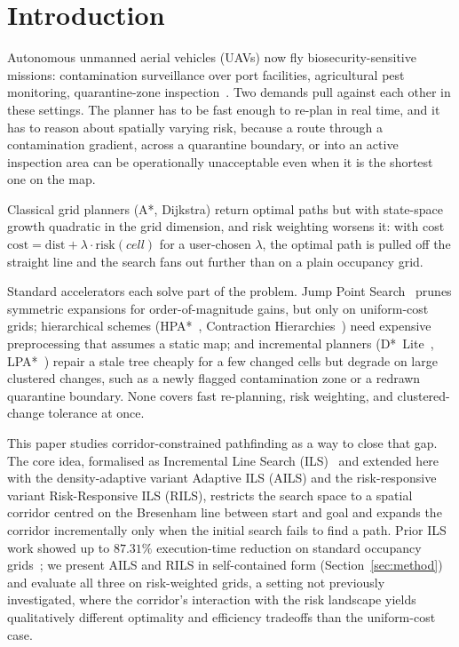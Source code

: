 \documentclass[preprint,12pt,authoryear]{elsarticle}
\begin{document}

\section{Introduction}\label{sec:intro}

Autonomous unmanned aerial vehicles (UAVs) now fly biosecurity-sensitive missions: contamination surveillance over port facilities, agricultural pest monitoring, quarantine-zone inspection~\citep{WHO2021,FAO2023}. Two demands pull against each other in these settings. The planner has to be fast enough to re-plan in real time, and it has to reason about spatially varying risk, because a route through a contamination gradient, across a quarantine boundary, or into an active inspection area can be operationally unacceptable even when it is the shortest one on the map.

Classical grid planners (A*, Dijkstra) return optimal paths but with state-space growth quadratic in the grid dimension, and risk weighting worsens it: with cost $\mathrm{cost} = \mathrm{dist} + \lambda \cdot \mathrm{risk}(cell)$ for a user-chosen $\lambda$, the optimal path is pulled off the straight line and the search fans out further than on a plain occupancy grid.

Standard accelerators each solve part of the problem. Jump Point Search~\citep{Harabor2011} prunes symmetric expansions for order-of-magnitude gains, but only on uniform-cost grids; hierarchical schemes (HPA*~\citep{Botea2004}, Contraction Hierarchies~\citep{Geisberger2008}) need expensive preprocessing that assumes a static map; and incremental planners (D*~Lite~\citep{Koenig2002}, LPA*~\citep{Koenig2004}) repair a stale tree cheaply for a few changed cells but degrade on large clustered changes, such as a newly flagged contamination zone or a redrawn quarantine boundary. None covers fast re-planning, risk weighting, and clustered-change tolerance at once.

This paper studies corridor-constrained pathfinding as a way to close that gap.
The core idea, formalised as Incremental Line Search (ILS)~\citep{Elshahed2025ILS} and extended here with the density-adaptive variant Adaptive ILS (AILS) and the risk-responsive variant Risk-Responsive ILS (RILS), restricts the search space to a spatial corridor centred on the Bresenham line between start and goal and expands the corridor incrementally only when the initial search fails to find a path.
Prior ILS work showed up to $87.31\%$ execution-time reduction on standard occupancy grids~\citep{Elshahed2025ILS}; we present AILS and RILS in self-contained form (Section~\ref{sec:method}) and evaluate all three on risk-weighted grids, a setting not previously investigated, where the corridor's interaction with the risk landscape yields qualitatively different optimality and efficiency tradeoffs than the uniform-cost case.
\end{document}
